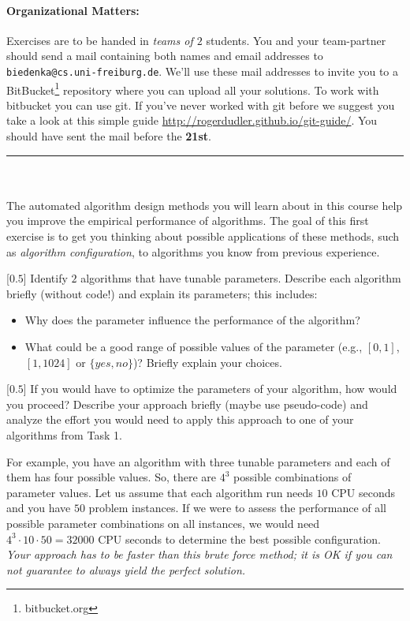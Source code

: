 \documentclass{exam}
\begin{document}
    \paragraph{Organizational Matters: }
    Exercises are to be handed in \emph{teams of $2$} students. You and your team-partner should send a mail containing both names and email addresses to \texttt{biedenka@cs.uni-freiburg.de}. We'll use these mail addresses to invite you to a BitBucket\footnote{bitbucket.org} repository where you can upload all your solutions. To work with bitbucket you can use git. If you've never worked with git before we suggest you take a look at this simple guide \url{http://rogerdudler.github.io/git-guide/}. You should have sent the mail before the \textbf{21st}.\\\vspace*{-5pt}\hspace*{-2pt}
\rule{\textwidth}{.5pt}\\
\\
\noindent
The automated algorithm design methods you will learn about in this course help you improve the empirical performance of algorithms. The goal of this first exercise is to get you thinking about possible applications of these methods, such as \emph{algorithm configuration}, to algorithms you know from previous experience.\vspace*{5pt}

\begin{questions}
	[$0.5$]
		Identify $2$ algorithms that have tunable parameters. Describe each algorithm briefly (without code!) and explain its parameters; this includes:
		\begin{itemize}
		  \item Why does the parameter influence the performance of the algorithm? 
		  \item What could be a good range of possible values of the parameter (e.g., $[0,1]$, $[1,1024]$ or $\{yes,no\}$)? Briefly explain your choices.
		\end{itemize}
		
	[$0.5$]
		If you would have to optimize the parameters of your algorithm, how would you proceed? Describe your approach briefly (maybe use pseudo-code) and analyze the effort you would need to apply this approach to one of your algorithms from Task 1. 
		
		For example, you have an algorithm with three tunable parameters and each of them has four possible values. So, there are $4^3$ possible combinations of parameter values. Let us assume that each algorithm run needs 
		$10$ CPU seconds and you have $50$ problem instances. 
		If we were to assess the performance of all possible parameter combinations on all instances, we would need 
		$4^3 \cdot 10 \cdot 50 = 32000$ CPU seconds to determine the best possible configuration. 
		\emph{Your approach has to be faster than this brute force method; it is OK if you can not guarantee to always yield the perfect solution.}
	
\end{questions}
\end{document}
